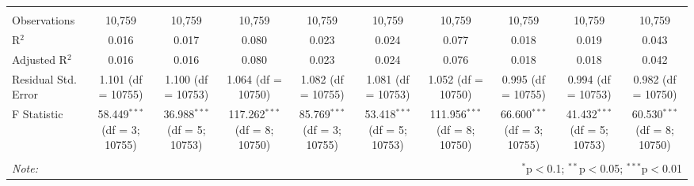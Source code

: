 \begin{table}[!htbp]
\begin{tabular}{@{\extracolsep{5pt}}lccccccccc}
 \hline \\[-1.8ex] 
Observations & 10,759 & 10,759 & 10,759 & 10,759 & 10,759 & 10,759 & 10,759 & 10,759 & 10,759 \\ 
R$^{2}$ & 0.016 & 0.017 & 0.080 & 0.023 & 0.024 & 0.077 & 0.018 & 0.019 & 0.043 \\ 
Adjusted R$^{2}$ & 0.016 & 0.016 & 0.080 & 0.023 & 0.024 & 0.076 & 0.018 & 0.018 & 0.042 \\ 
Residual Std. Error & 1.101 (df = 10755) & 1.100 (df = 10753) & 1.064 (df = 10750) & 1.082 (df = 10755) & 1.081 (df = 10753) & 1.052 (df = 10750) & 0.995 (df = 10755) & 0.994 (df = 10753) & 0.982 (df = 10750) \\ 
F Statistic & 58.449$^{***}$ (df = 3; 10755) & 36.988$^{***}$ (df = 5; 10753) & 117.262$^{***}$ (df = 8; 10750) & 85.769$^{***}$ (df = 3; 10755) & 53.418$^{***}$ (df = 5; 10753) & 111.956$^{***}$ (df = 8; 10750) & 66.600$^{***}$ (df = 3; 10755) & 41.432$^{***}$ (df = 5; 10753) & 60.530$^{***}$ (df = 8; 10750) \\ 
\hline 
\hline \\[-1.8ex] 
\textit{Note:}  & \multicolumn{9}{r}{$^{*}$p$<$0.1; $^{**}$p$<$0.05; $^{***}$p$<$0.01} \\ 
\end{tabular} 
\end{table} 
